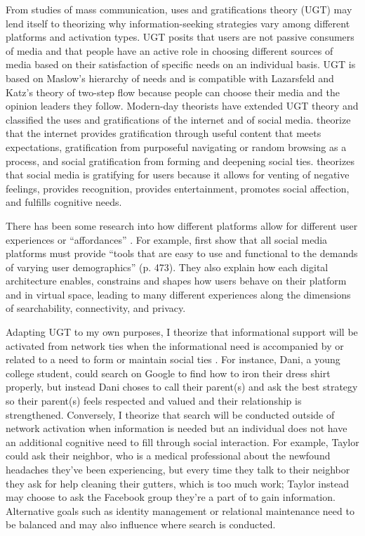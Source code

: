 From studies of mass communication, uses and gratifications theory (UGT)
\citep{blumlerUsesMassCommunications1974, tanMassCommunicationTheories1985} may
lend itself to theorizing why information-seeking strategies vary among
different platforms and activation types. UGT posits that users are not passive
consumers of media and that people have an active role in choosing different
sources of media based on their satisfaction of specific needs on an individual
basis. UGT is based on Maslow's \citeyearpar{maslowTheoryHumanMotivation1943}
hierarchy of needs and is compatible with Lazarsfeld and Katz's theory of
two-step flow because people can choose their media and the opinion leaders they
follow. Modern-day theorists have extended UGT theory and classified the uses
and gratifications of the internet and of social media.
\citet{staffordDeterminingUsesGratifications2004} theorize that the internet
provides gratification through useful content that meets expectations,
gratification from purposeful navigating or random browsing as a process, and
social gratification from forming and deepening social ties.
\citet{leungGenerationalDifferencesContent2013} theorizes that social media is
gratifying for users because it allows for venting of negative feelings,
provides recognition, provides entertainment, promotes social affection, and
fulfills cognitive needs.

There has been some research into how different platforms allow for different
user experiences or ``affordances'' \citep{boyd2010social}. For example,
\citet{bossetta18} first show that all social media platforms must provide
``tools that are easy to use and functional to the demands of varying user
demographics'' (p. 473). They also explain how each digital architecture enables,
constrains and shapes how users behave on their platform and in virtual space,
leading to many different experiences along the dimensions of searchability,
connectivity, and privacy.

Adapting UGT to my own purposes, I theorize that informational support will be
activated from network ties when the informational need is accompanied by or
related to a need to form or maintain social ties
\citep{baumeister,grieve2013face}. For instance, Dani, a young college student,
could search on Google to find how to iron their dress shirt properly, but
instead Dani choses to call their parent(s) and ask the best strategy so their
parent(s) feels respected and valued and their relationship is strengthened.
Conversely, I theorize that search will be conducted outside of network
activation when information is needed but an individual does not have an
additional cognitive need to fill through social interaction. For example,
Taylor could ask their neighbor, who is a medical professional about the
newfound headaches they've been experiencing, but every time they talk to their
neighbor they ask for help cleaning their gutters, which is too much work;
Taylor instead may choose to ask the Facebook group they're a part of to gain
information. Alternative goals such as identity management or relational
maintenance \citep{brashersInformationSeekingAvoiding2002} need to be balanced
and may also influence where search is conducted.

